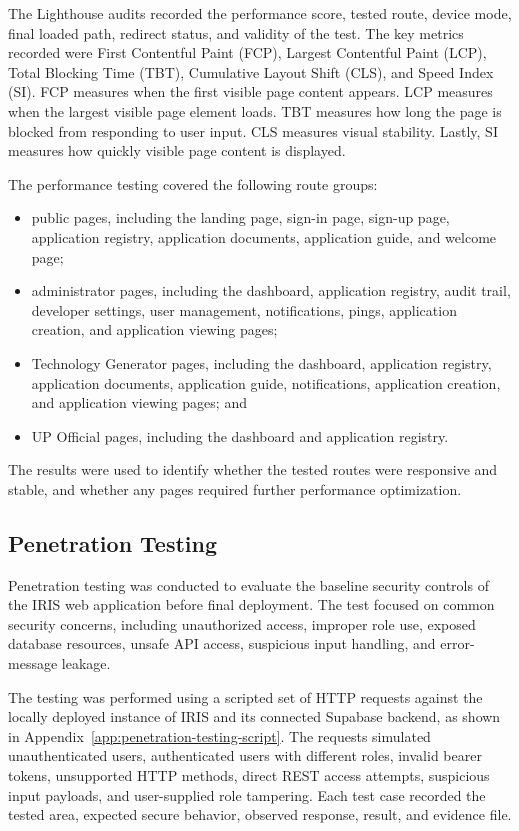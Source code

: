 The Lighthouse audits recorded the performance score, tested route, device mode, final loaded path, redirect status, and validity of the test. The key metrics recorded were First Contentful Paint (FCP), Largest Contentful Paint (LCP), Total Blocking Time (TBT), Cumulative Layout Shift (CLS), and Speed Index (SI). FCP measures when the first visible page content appears. LCP measures when the largest visible page element loads. TBT measures how long the page is blocked from responding to user input. CLS measures visual stability. Lastly, SI measures how quickly visible page content is displayed.

The performance testing covered the following route groups:

\begin{itemize}
    \item public pages, including the landing page, sign-in page, sign-up page, application registry, application documents, application guide, and welcome page;
    \item administrator pages, including the dashboard, application registry, audit trail, developer settings, user management, notifications, pings, application creation, and application viewing pages;
    \item Technology Generator pages, including the dashboard, application registry, application documents, application guide, notifications, application creation, and application viewing pages; and
    \item UP Official pages, including the dashboard and application registry.
\end{itemize}

The results were used to identify whether the tested routes were responsive and stable, and whether any pages required further performance optimization.

\FloatBarrier

\subsection{Penetration Testing}

Penetration testing was conducted to evaluate the baseline security controls of the IRIS web application before final deployment. The test focused on common security concerns, including unauthorized access, improper role use, exposed database resources, unsafe API access, suspicious input handling, and error-message leakage.

The testing was performed using a scripted set of HTTP requests against the locally deployed instance of IRIS and its connected Supabase backend, as shown in Appendix~\ref{app:penetration-testing-script}. The requests simulated unauthenticated users, authenticated users with different roles, invalid bearer tokens, unsupported HTTP methods, direct REST access attempts, suspicious input payloads, and user-supplied role tampering. Each test case recorded the tested area, expected secure behavior, observed response, result, and evidence file.

